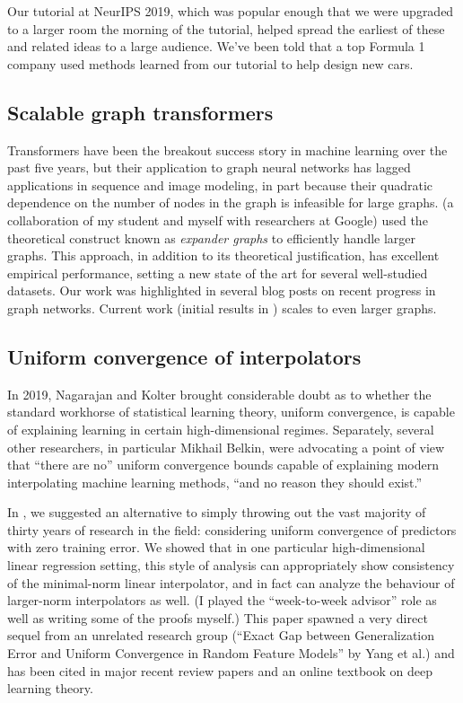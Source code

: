\documentclass[12pt]{article}
\begin{document}
Our tutorial at NeurIPS 2019, which was popular enough that we were upgraded to a larger room the morning of the tutorial, helped spread the earliest of these and related ideas to a large audience. We've been told that a top Formula 1 company used methods learned from our tutorial to help design new cars.

\subsection{Scalable graph transformers} \label{sec:exphormers}
Transformers have been the breakout success story in machine learning over the past five years,
but their application to graph neural networks has lagged applications in sequence and image modeling,
in part because their quadratic dependence on the number of nodes in the graph
is infeasible for large graphs.
\cite{shirzad:exphormer} (a collaboration of my student and myself with researchers at Google)
used the theoretical construct known as \emph{expander graphs}
to efficiently handle larger graphs.
This approach, in addition to its theoretical justification,
has excellent empirical performance,
setting a new state of the art for several well-studied datasets.
Our work was highlighted in several blog posts on recent progress in graph networks.
Current work (initial results in \cite{shirzad:sparsifying-exphormer})
scales to even larger graphs.

\subsection{Uniform convergence of interpolators} \label{sec:interpolators}
In 2019, Nagarajan and Kolter brought considerable doubt as to whether the standard workhorse of statistical learning theory, uniform convergence, is capable of explaining learning in certain high-dimensional regimes. Separately, several other researchers, in particular Mikhail Belkin, were advocating a point of view that ``there are no'' uniform convergence bounds capable of explaining modern interpolating machine learning methods, ``and no reason they should exist.''

In \cite{zhou:uniform-interpolation}, we suggested an alternative to simply throwing out the vast majority of thirty years of research in the field: considering uniform convergence of predictors with zero training error. We showed that in one particular high-dimensional linear regression setting, this style of analysis can appropriately show consistency of the minimal-norm linear interpolator, and in fact can analyze the behaviour of larger-norm interpolators as well. (I played the ``week-to-week advisor'' role as well as writing some of the proofs myself.) This paper spawned a very direct sequel from an unrelated research group (``Exact Gap between Generalization Error and Uniform Convergence in Random Feature Models'' by Yang et al.) and has been cited in major recent review papers and an online textbook on deep learning theory.
\end{document}
